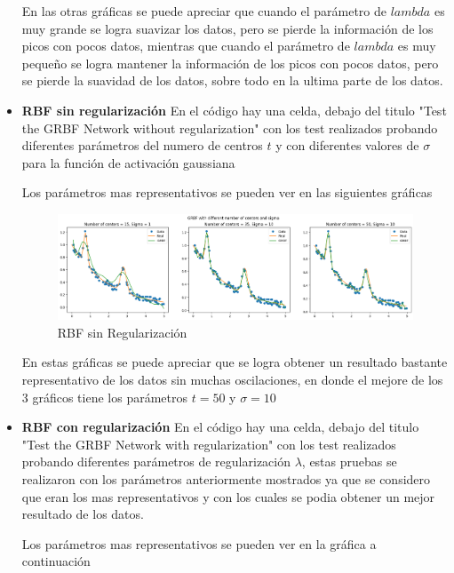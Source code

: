 \documentclass{article}
\theoremstyle{mytheoremstyle}
\theoremstyle{mytheoremstyle}
\theoremstyle{myproblemstyle}
\begin{document}
\begin{itemize}
        En las otras gráficas se puede apreciar que cuando el parámetro de $lambda$ es muy grande se logra suavizar los datos, pero se pierde la información de los picos con pocos datos, mientras que cuando el parámetro de $lambda$ es muy pequeño se logra mantener la información de los picos con pocos datos, pero se pierde la suavidad de los datos, sobre todo en la ultima parte de los datos.

  \item \textbf{RBF sin regularización}
        En el código hay una celda, debajo del titulo "Test the GRBF Network without regularization" con los test realizados probando diferentes parámetros del numero de centros $t$ y con diferentes valores de $\sigma$ para la función de activación gaussiana

        Los parámetros mas representativos se pueden ver en las siguientes gráficas

        \begin{figure}[!ht]
          \centering
          \includegraphics[width=1\textwidth]{./imgs/RBF/rbf.png}
          \caption{RBF sin Regularización}
          \label{fig:7}
        \end{figure}

        En estas gráficas se puede apreciar que se logra obtener un resultado bastante representativo de los datos sin muchas oscilaciones, en donde el mejore de los 3 gráficos tiene los parámetros $t=50$ y $\sigma=10$

  \item \textbf{RBF con regularización}
        En el código hay una celda, debajo del titulo "Test the GRBF Network with regularization" con los test realizados probando diferentes parámetros de regularización $\lambda$, estas pruebas se realizaron con los parámetros anteriormente mostrados ya que se considero que eran los mas representativos y con los cuales se podia obtener un mejor resultado de los datos.

        Los parámetros mas representativos se pueden ver en la gráfica a continuación


\end{itemize}
\end{document}
